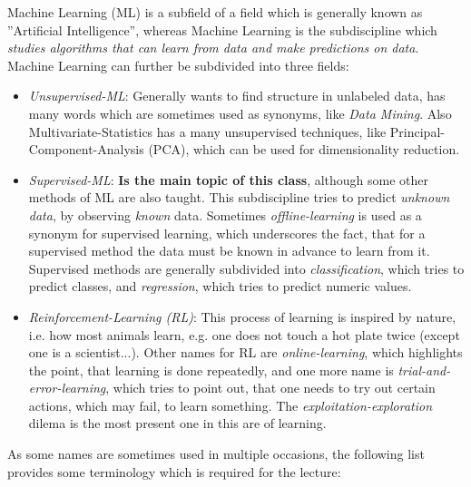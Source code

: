 \documentclass[12pt,a4paper]{article}
\begin{document}
\noindent Machine Learning (ML) is a subfield of a field which is generally known as ''Artificial Intelligence'', whereas Machine Learning is the subdiscipline which \textit{studies algorithms that can learn from data and make predictions on data}. Machine Learning can further be subdivided into three fields:
\begin{itemize}
    \item \textit{Unsupervised-ML}: Generally wants to find structure in unlabeled data, has many words which are sometimes used as synonyms, like \textit{Data Mining}. Also Multivariate-Statistics has a many unsupervised techniques, like Principal-Component-Analysis (PCA), which can be used for dimensionality reduction.
    \item \textit{Supervised-ML}: \textbf{Is the main topic of this class}, although some other methods of ML are also taught. This subdiscipline tries to predict \textit{unknown data}, by observing \textit{known} data. Sometimes \textit{offline-learning} is used as a synonym for supervised learning, which underscores the fact, that for a supervised method the data must be known in advance to learn from it. Supervised methods are generally subdivided into \textit{classification}, which tries to predict classes, and \textit{regression}, which tries to predict numeric values.
    \item \textit{Reinforcement-Learning (RL)}: This process of learning is inspired by nature, i.e. how most animals learn, e.g. one does not touch a hot plate twice (except one is a scientist...). Other names for RL are \textit{online-learning}, which highlights the point, that learning is done repeatedly, and one more name is \textit{trial-and-error-learning}, which tries to point out, that one needs to try out certain actions, which may fail, to learn something. The \textit{exploitation-exploration} dilema is the most present one in this are of learning.
\end{itemize}

\noindent As some names are sometimes used in multiple occasions, the following list provides some terminology which is required for the lecture:
\end{document}
